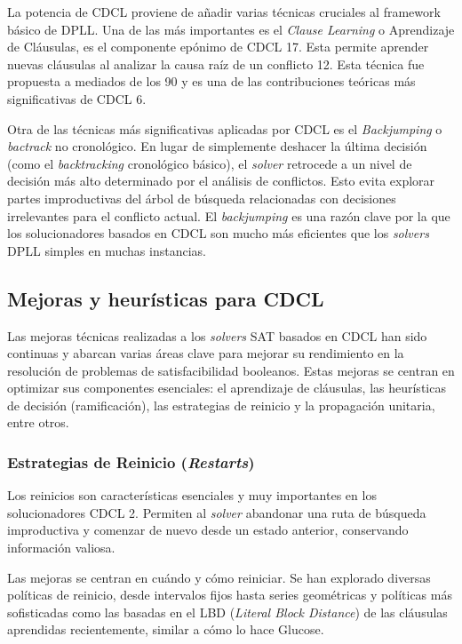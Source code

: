 La potencia de CDCL proviene de añadir varias técnicas cruciales al framework básico de DPLL. Una de las más importantes es el \textit{Clause Learning} o Aprendizaje de Cláusulas, es el componente epónimo de CDCL 17. Esta permite aprender nuevas cláusulas al analizar la causa raíz de un conflicto 12. Esta técnica fue propuesta a mediados de los 90 y es una de las contribuciones teóricas más significativas de CDCL 6.

Otra de las técnicas más significativas aplicadas por CDCL es el \textit{Backjumping} o \textit{bactrack} no cronológico. En lugar de simplemente deshacer la última decisión (como el \textit{backtracking} cronológico básico), el \textit{solver} retrocede a un nivel de decisión más alto determinado por el análisis de conflictos. Esto evita explorar partes improductivas del árbol de búsqueda relacionadas con decisiones irrelevantes para el conflicto actual. El \textit{backjumping} es una razón clave por la que los solucionadores basados en CDCL son mucho más eficientes que los \textit{solvers} DPLL simples en muchas instancias.

\subsection{Mejoras y heurísticas para CDCL}

Las mejoras técnicas realizadas a los \textit{solvers} SAT basados en CDCL han sido continuas y abarcan varias áreas clave para mejorar su rendimiento en la resolución de problemas de satisfacibilidad booleanos. Estas mejoras se centran en optimizar sus componentes esenciales: el aprendizaje de cláusulas, las heurísticas de decisión (ramificación), las estrategias de reinicio y la propagación unitaria, entre otros.

\subsubsection{Estrategias de Reinicio (\textit{Restarts})}

Los reinicios son características esenciales y muy importantes en los solucionadores CDCL 2. Permiten al \textit{solver} abandonar una ruta de búsqueda improductiva y comenzar de nuevo desde un estado anterior, conservando información valiosa. 

Las mejoras se centran en cuándo y cómo reiniciar. Se han explorado diversas políticas de reinicio, desde intervalos fijos hasta series geométricas y políticas más sofisticadas como las basadas en el LBD (\textit{Literal Block Distance}) de las cláusulas aprendidas recientemente, similar a cómo lo hace Glucose.

